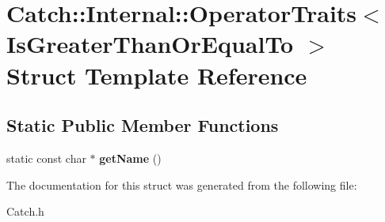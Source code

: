 \hypertarget{struct_catch_1_1_internal_1_1_operator_traits_3_01_is_greater_than_or_equal_to_01_4}{\section{Catch\-:\-:Internal\-:\-:Operator\-Traits$<$ Is\-Greater\-Than\-Or\-Equal\-To $>$ Struct Template Reference}
\label{struct_catch_1_1_internal_1_1_operator_traits_3_01_is_greater_than_or_equal_to_01_4}
}
\subsection*{Static Public Member Functions}
\begin{DoxyCompactItemize}
\item 
\hypertarget{struct_catch_1_1_internal_1_1_operator_traits_3_01_is_greater_than_or_equal_to_01_4_a76b6f6b0dbaf7d19ebb1b4b4891e719e}{static const char $\ast$ {\bfseries get\-Name} ()}\label{struct_catch_1_1_internal_1_1_operator_traits_3_01_is_greater_than_or_equal_to_01_4_a76b6f6b0dbaf7d19ebb1b4b4891e719e}

\end{DoxyCompactItemize}


The documentation for this struct was generated from the following file\-:\begin{DoxyCompactItemize}
\item 
Catch.\-h\end{DoxyCompactItemize}
